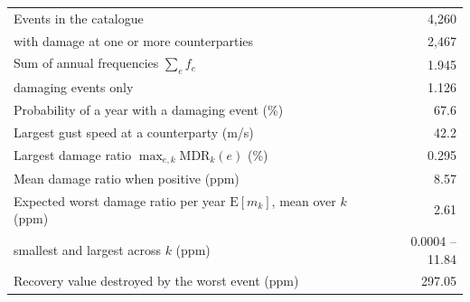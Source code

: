 \begin{tabular}{lr}
\toprule
Events in the catalogue & 4,260 \\
\quad with damage at one or more counterparties & 2,467 \\
Sum of annual frequencies $\sum_e f_e$ & 1.945 \\
\quad damaging events only & 1.126 \\
Probability of a year with a damaging event (\%) & 67.6 \\
Largest gust speed at a counterparty (m/s) & 42.2 \\
Largest damage ratio $\max_{e,k}\mathrm{MDR}_k(e)$ (\%) & 0.295 \\
Mean damage ratio when positive (ppm) & 8.57 \\
Expected worst damage ratio per year $\mathrm{E}[m_k]$, mean over $k$ (ppm) & 2.61 \\
\quad smallest and largest across $k$ (ppm) & 0.0004 -- 11.84 \\
Recovery value destroyed by the worst event (ppm) & 297.05 \\
\bottomrule
\end{tabular}
